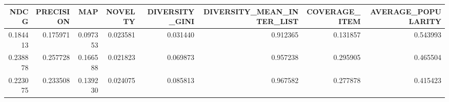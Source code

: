 \begin{tabular}{rrrrrrrr}
\toprule
    NDCG &  PRECISION &      MAP &  NOVELTY &  DIVERSITY\_GINI &  DIVERSITY\_MEAN\_INTER\_LIST &  COVERAGE\_ITEM &  AVERAGE\_POPULARITY \\
\midrule
0.184413 &   0.175971 & 0.097353 & 0.023581 &        0.031440 &                   0.912365 &       0.131857 &            0.543993 \\
0.238878 &   0.257728 & 0.166588 & 0.021823 &        0.069873 &                   0.957238 &       0.295905 &            0.465504 \\
0.223075 &   0.233508 & 0.139230 & 0.024075 &        0.085813 &                   0.967582 &       0.277878 &            0.415423 \\
\bottomrule
\end{tabular}
